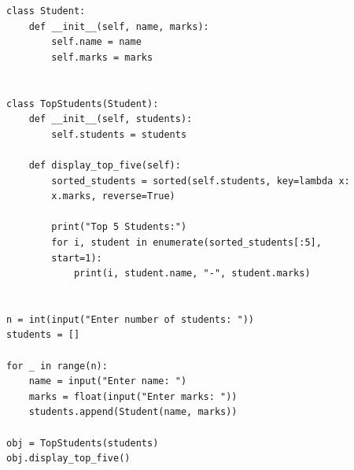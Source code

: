 \begin{verbatim}
class Student:
    def __init__(self, name, marks):
        self.name = name
        self.marks = marks


class TopStudents(Student):
    def __init__(self, students):
        self.students = students

    def display_top_five(self):
        sorted_students = sorted(self.students, key=lambda x: 
        x.marks, reverse=True)

        print("Top 5 Students:")
        for i, student in enumerate(sorted_students[:5], 
        start=1):
            print(i, student.name, "-", student.marks)


n = int(input("Enter number of students: "))
students = []

for _ in range(n):
    name = input("Enter name: ")
    marks = float(input("Enter marks: "))
    students.append(Student(name, marks))

obj = TopStudents(students)
obj.display_top_five()
\end{verbatim}